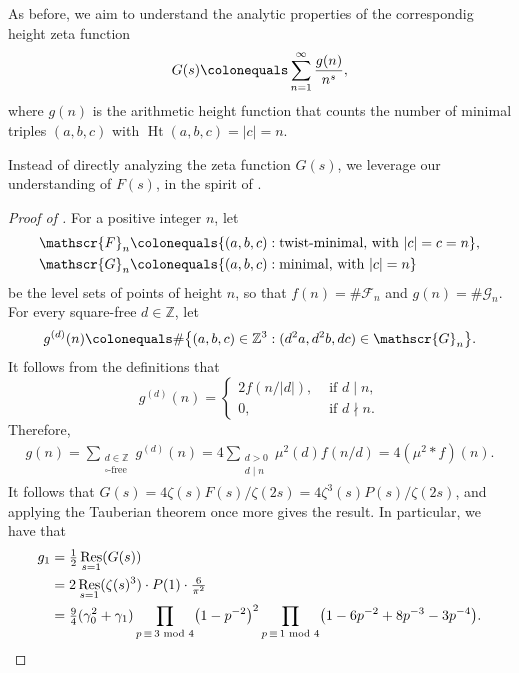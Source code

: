 \documentclass[12pt]{amsart}
\numberwithin{equation}{section} %
\theoremstyle{definition} \newtheorem{definition}[counter]{Definition}
\theoremstyle{remark} \newtheorem{nonexam}[counter]{Non-example}
\newcommand{\ZZ}{\mathbb{Z}} %
\newcommand{\FF}{\mathscr{F}} %
\newcommand{\GG}{\mathscr{G}}
\newcommand{\md}{\text{ mod }} %
\newcommand{\paren}[1]{\left( #1 \right)} %
\newcommand{\brk}[1]{\left\lbrace #1 \right\rbrace} %
\newcommand{\cdef}[1]{\textsf{#1}} %
\newcommand{\mif}{\text{ if }} %
\let\originalleft\left \let\originalright\right
\renewcommand{\left}{\mathopen{}\mathclose\bgroup\originalleft}
\renewcommand{\right}{\aftergroup\egroup\originalright}
\DeclareMathOperator{\Res}{Res} %
\DeclareMathOperator{\Ht}{Ht} %
\begin{document}
As before, we aim to understand the analytic properties of the correspondig
\cdef{height zeta function}
\begin{equation*}
    G(s) \colonequals \sum_{n=1}^\infty \frac{g(n)}{n^{s}}, 
\end{equation*}
where $g(n)$ is the \cdef{arithmetic height function} that counts the number of
minimal triples $(a,b,c)$ with $\Ht(a,b,c) = |c| = n$.

Instead of directly analyzing the zeta function $G(s)$, we leverage our
understanding of $F(s)$, in the spirit of \cite[Theorem 5.1.4]{MV22}.

\begin{proof}[Proof of {}]
    For a positive integer $n$, let 
    \begin{align*}
        \FF_n &\colonequals \brk{(a,b,c) : \text{twist-minimal, with } |c| = c = n}, \\
        \GG_n &\colonequals \brk{(a,b,c) : \text{minimal, with } |c| = n}
    \end{align*}
    be the level sets of points of height $n$, so that $f(n) = \#\FF_n$ and
    $g(n) = \#\GG_n$. For every square-free $d \in \ZZ$, let
    \begin{equation*}
        g^{(d)}(n) \colonequals \#\brk{(a,b,c) \in \ZZ^3 : (d^2a, d^2b, dc) \in \GG_n}.
    \end{equation*}
    It follows from the definitions that
    \begin{equation}
        g^{(d)}(n) = 
        \begin{cases}
            2f(n/|d|), & \mif d \mid n, \\
            0, & \mif d \nmid n.
        \end{cases}
    \end{equation}
    Therefore,
    \begin{align*}
        g(n) = \sum_{\substack{d \in \ZZ \\ \square\text{-free}}} g^{(d)}(n) = 4\sum_{\substack{d > 0 \\ d \mid n}} \mu^2(d)f(n/d) = 4(\mu^2*f)(n).
    \end{align*}
    It follows that
    $G(s) = 4\zeta(s)F(s)/\zeta(2s) = 4\zeta^3(s)P(s)/\zeta(2s)$, and applying
    the Tauberian theorem once more gives the result. In particular, we have
    that
    \begin{align*}
      g_1 &= \tfrac12 \Res_{s=1}(G(s)) \\
          &= 2\Res_{s=1}(\zeta(s)^3)\cdot P(1)\cdot\tfrac{6}{\pi^2}\\
          &= \tfrac{9}{4}(\gamma_0^2+\gamma_1)\prod_{p \, \equiv\, 3 \md 4}\paren{1-p^{-2}}^2
      \prod_{p \, \equiv\, 1 \md 4}\paren{1 -6p^{-2}+8p^{-3}-3p^{-4}}.
    \end{align*}
\end{proof}
    
\end{document}
